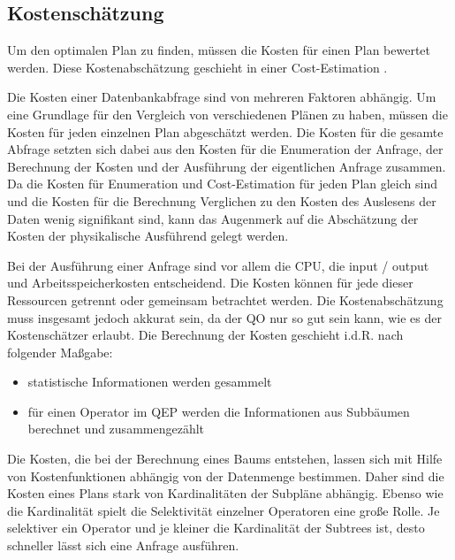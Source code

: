 \subsection{Kostenschätzung}

Um den optimalen Plan zu finden, müssen die Kosten für einen Plan bewertet werden. Diese Kostenabschätzung geschieht in einer Cost-Estimation \cite{bruno2011automated}. 

Die Kosten einer Datenbankabfrage sind von mehreren Faktoren abhängig. Um eine Grundlage für den Vergleich von verschiedenen Plänen zu haben, müssen die Kosten für jeden einzelnen Plan abgeschätzt werden. Die Kosten für die gesamte Abfrage setzten sich dabei aus den Kosten für die Enumeration der Anfrage, der Berechnung der Kosten und der Ausführung der eigentlichen Anfrage zusammen. Da die Kosten für Enumeration und Cost-Estimation für jeden Plan gleich sind und die Kosten für die Berechnung Verglichen zu den Kosten des Auslesens der Daten wenig signifikant sind\cite{selinger1979access}, kann das Augenmerk auf die Abschätzung der Kosten der physikalische Ausführend gelegt werden.

Bei der Ausführung einer Anfrage sind vor allem die CPU, die input / output und Arbeitsspeicherkosten entscheidend. Die Kosten können für jede dieser Ressourcen getrennt oder gemeinsam betrachtet werden. Die Kostenabschätzung muss insgesamt jedoch akkurat sein, da der \ac{QO} nur so gut sein kann, wie es der Kostenschätzer erlaubt. Die Berechnung der Kosten geschieht i.d.R. nach folgender Maßgabe:

\begin{itemize}
\item statistische Informationen werden gesammelt
\item für einen Operator im \ac{QEP} werden die Informationen aus Subbäumen berechnet und zusammengezählt
\end{itemize}

Die Kosten, die bei der Berechnung eines Baums entstehen,  lassen sich mit Hilfe von Kostenfunktionen abhängig von der Datenmenge bestimmen. Daher sind die Kosten eines Plans stark von Kardinalitäten der Subpläne abhängig. Ebenso wie die Kardinalität spielt die Selektivität einzelner Operatoren eine große Rolle. Je selektiver ein Operator und je kleiner die Kardinalität der Subtrees ist,  desto schneller lässt sich eine Anfrage ausführen.

 
